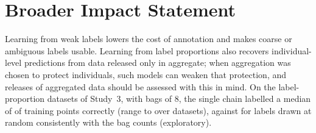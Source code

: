 \section*{Broader Impact Statement}
Learning from weak labels lowers the cost of annotation and makes coarse or ambiguous labels usable. Learning from label
proportions also recovers individual-level predictions from data released only in aggregate; when aggregation was
chosen to protect individuals, such models can weaken that protection, and releases of aggregated data should be
assessed with this in mind. On the label-proportion datasets of Study~3, with bags of 8, the single chain labelled a
median of  of training points correctly (range  to
 over datasets), against  for labels drawn at random consistently with
the bag counts (exploratory).
